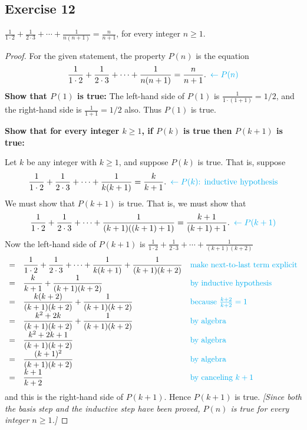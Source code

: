 \documentclass[14pt]{extarticle}
\newcommand{\dps}{\displaystyle}
\newcommand{\from}{\leftarrow}
\newcommand{\cy}{\color{cyan}}
\begin{document}
\subsection{Exercise 12}
$\dps \frac{1}{1 \cdot 2} + \frac{1}{2 \cdot 3} + \cdots + \frac{1}{n(n+1)} = \frac{n}{n+1}$, for every integer $n \geq 1$.

\begin{proof}
For the given statement, the property $P(n)$ is the equation
\[
\dps \frac{1}{1 \cdot 2} + \frac{1}{2 \cdot 3} + \cdots + \frac{1}{n(n+1)} = \frac{n}{n+1}. \,\,\, {\cy \from P(n)}
\]
{\bf Show that $P(1)$ is true:} The left-hand side of $P(1)$ is $\frac{1}{1\cdot (1+1)} = 1/2$, and the right-hand side is $\frac{1}{1+1} = 1/2$ also. Thus $P(1)$ is true.

{\bf Show that for every integer $k \geq 1$, if $P(k)$ is true then $P(k + 1)$ is true:}

Let $k$ be any integer with $k \geq 1$, and suppose $P(k)$ is true. That is, suppose
\[
\dps \frac{1}{1 \cdot 2} + \frac{1}{2 \cdot 3} + \cdots + \frac{1}{k(k+1)} = \frac{k}{k+1}. \,\,\, {\cy \from P(k) \text{: inductive hypothesis}}
\]
We must show that $P(k + 1)$ is true. That is, we must show that
\[
\dps \frac{1}{1 \cdot 2} + \frac{1}{2 \cdot 3} + \cdots + \frac{1}{(k+1)((k+1)+1)} = \frac{k+1}{(k+1)+1}. \,\,\,{\cy \from P(k+1)}
\]
Now the left-hand side of $P(k + 1)$ is $\dps \frac{1}{1 \cdot 2} + \frac{1}{2 \cdot 3} + \cdots + \frac{1}{(k+1)(k+2)}$
\[
\begin{array}{lll}
= & \dps \frac{1}{1 \cdot 2} + \frac{1}{2 \cdot 3} + \cdots + \frac{1}{k(k+1)} + \frac{1}{(k+1)(k+2)} & \text{\cy make next-to-last term explicit} \\
= & \dps \frac{k}{k+1} + \frac{1}{(k+1)(k+2)} & \text{\cy by inductive hypothesis} \\
= & \dps \frac{k(k+2)}{(k+1)(k+2)} + \frac{1}{(k+1)(k+2)} & \text{\cy because $\frac{k+2}{k+2} = 1$} \\
= & \dps \frac{k^2+2k}{(k+1)(k+2)} + \frac{1}{(k+1)(k+2)} & \text{\cy by algebra} \\
= & \dps \frac{k^2+2k+1}{(k+1)(k+2)} & \text{\cy by algebra} \\
= & \dps \frac{(k+1)^2}{(k+1)(k+2)} & \text{\cy by algebra} \\
= & \dps \frac{k+1}{k+2} & \text{\cy by canceling $k+1$}
\end{array}
\]
and this is the right-hand side of $P(k + 1)$. Hence $P(k + 1)$ is true. {\it [Since both the basis step and the inductive step have been proved, $P(n)$ is true for every integer $n \geq 1$.]}
\end{proof}
\end{document}
